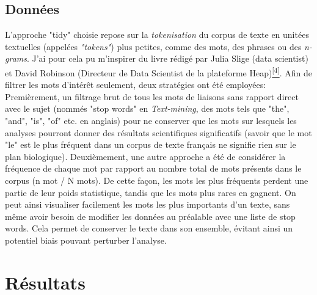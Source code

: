 \documentclass{book}
\begin{document}
\section{Données}
\noindent
L'approche "tidy" choisie repose sur la \textit{tokenisation} du corpus
de texte en unitées textuelles (appelées \textit{"tokens"}) plus petites, comme
des mots, des phrases ou des \textit{n-grams}. J'ai pour cela pu m'inspirer du
livre rédigé par Julia Slige (data scientist) et David Robinson (Directeur de
Data Scientist de la plateforme Heap)\hyperref[site3]{\textsuperscript{[4]}}. Afin de filtrer les mots d'intérêt seulement, deux stratégies ont été
employées: Premièrement, un filtrage brut de tous les mots de liaisons sans
rapport direct avec le sujet (nommés "stop words" en \textit{Text-mining}, des mots tels
que "the", "and", "is", "of" etc. en anglais) pour ne conserver que les mots
sur lesquels les analyses pourront donner des résultats scientifiques
significatifs (savoir que le mot "le" est le plus fréquent dans un corpus de
texte français ne signifie rien sur le plan biologique). Deuxièmement, une
autre approche a été de considérer la fréquence de chaque mot par rapport au
nombre total de mots présents dans le corpus (n mot / N mots). De cette façon,
les mots les plus fréquents perdent une partie de leur poids statistique, tandis que les mots plus rares en gagnent. On peut ainsi visualiser facilement les mots les plus importants d'un texte, sans même
avoir besoin de modifier les données au préalable avec une liste de stop words.
Cela permet de conserver le texte dans son ensemble, évitant ainsi un potentiel
biais pouvant perturber l'analyse.

\chapter{\label{Troisieme Chapitre}Résultats}
\end{document}
